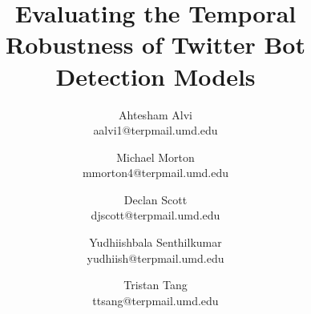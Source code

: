 \setlength{\textfloatsep}{8pt}
\setlength{\floatsep}{6pt}
\setlength{\intextsep}{6pt}
\usepackage[font=small,labelfont=bf]{caption}

\usepackage{graphicx}
\graphicspath{{../figures/}}



\date{}

\title{\Large \bf Evaluating the Temporal Robustness of Twitter Bot Detection Models}

\author{
{\rm Ahtesham Alvi}\\
aalvi1@terpmail.umd.edu
\and
{\rm Michael Morton}\\
mmorton4@terpmail.umd.edu
\and
{\rm Declan Scott}\\
djscott@terpmail.umd.edu
\\
\and
{\rm Yudhiishbala Senthilkumar}\\
yudhiish@terpmail.umd.edu
\\
\and
{\rm Tristan Tang}\\
ttsang@terpmail.umd.edu
\\
}

\maketitle

